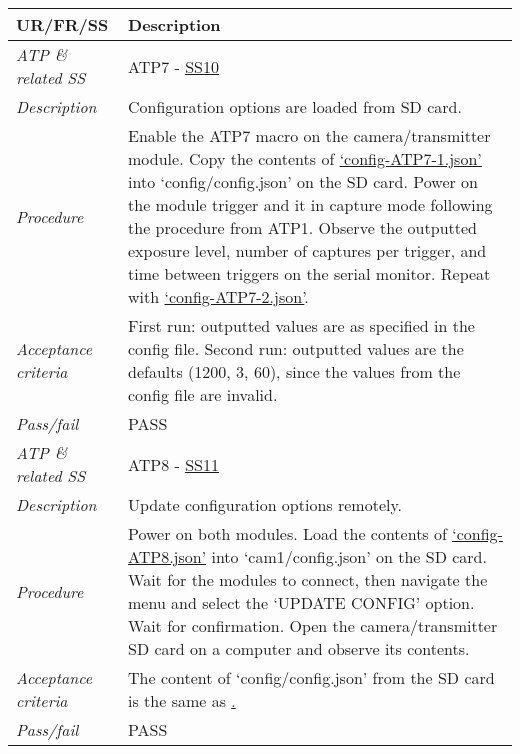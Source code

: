 \documentclass[class=report,11pt,crop=false]{standalone}
\begin{document}
\begin{table}[!ht]
    \centering
    \begin{scriptsize}
    \begin{tabularx}{\textwidth}{|p{} X|}
        
        \hline
        \textbf{UR/FR/SS} & \textbf{Description}\\ \hline

        \textit{ATP \& related SS} & ATP7 - \hyperlink{tab:firmware-requirements}{SS10} \\
        \textit{Description} & Configuration options are loaded from SD card.\\
        \textit{Procedure} & Enable the ATP7 macro on the camera/transmitter module. Copy the contents of \href{https://github.com/rothdu/EEE4113F-Group13-2024/blob/main/firmware/json-samples/config-ATP7-1.json}{`config-ATP7-1.json'} into `config/config.json' on the SD card. Power on the module trigger and it in capture mode following the procedure from ATP1. Observe the outputted exposure level, number of captures per trigger, and time between triggers on the serial monitor. Repeat with \href{https://github.com/rothdu/EEE4113F-Group13-2024/blob/main/firmware/json-samples/config-ATP7-2.json}{`config-ATP7-2.json'}. \\
        \textit{Acceptance criteria} & First run: outputted values are as specified in the config file. Second run: outputted values are the defaults (1200, 3, 60), since the values from the config file are invalid.\\ 
        \textit{Pass/fail} & PASS\\ \hline

        \textit{ATP \& related SS} & ATP8 - \hyperlink{tab:firmware-requirements}{SS11}\\
        \textit{Description} & Update configuration options remotely.\\
        \textit{Procedure} & Power on both modules. Load the contents of \href{https://github.com/rothdu/EEE4113F-Group13-2024/blob/main/firmware/json-samples/config-ATP8.json}{`config-ATP8.json'} into `cam1/config.json' on the SD card. Wait for the modules to connect, then navigate the menu and select the `UPDATE CONFIG' option. Wait for confirmation. Open the camera/transmitter SD card on a computer and observe its contents.\\
        \textit{Acceptance criteria} & The content of `config/config.json' from the SD card is the same as \href{https://github.com/rothdu/EEE4113F-Group13-2024/blob/main/firmware/json-samples/config-ATP8.json}.\\ 
        \textit{Pass/fail} & PASS \\ \hline


\end{tabularx}
\end{scriptsize}
\end{table}
\end{document}
